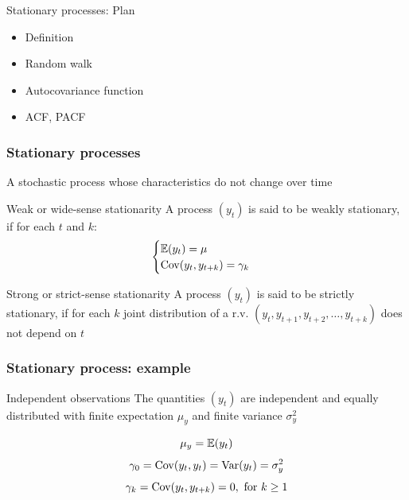 
\begin{frame} %


\end{frame}



\begin{frame}{Stationary processes: Plan}
  \begin{itemize}[<+->]
    \item Definition
    \item Random walk 
    \item Autocovariance function
    \item ACF, PACF
    
  \end{itemize}

\end{frame}

\begin{frame}
  \frametitle{Stationary processes}

   A stochastic process whose characteristics \alert{do not change over time}
  \pause

  \begin{block}{Weak or wide-sense stationarity}
    A process $(y_t)$  is said to be   \alert{weakly stationary}, if for each $t$ and $k$:
    \[
    \begin{cases}
      \mathbb{E}(y_t ) = \mu \\
      \operatorname{Cov}(y_t, y_{t+k}) = \gamma_k \\          
    \end{cases}
    \]
  \end{block}

  \pause
  \begin{block}{Strong or strict-sense stationarity}
    A process $(y_t)$  is said to be   \alert{ strictly stationary}, if for each  $k$ 
    joint  distribution of a r.v.  $(y_t, y_{t+1}, y_{t+2}, \ldots, y_{t+k})$ does not depend on  $t$
  \end{block}
\end{frame}




\begin{frame}
	\frametitle{Stationary process: example}
	
	\begin{block}{Independent observations}
		The quantities $(y_t)$ are independent and equally distributed
		with finite expectation $\mu_y$ and finite variance $\sigma^2_y$
	\end{block}
	
	\pause
	\[
	\mu_y = \mathbb{E}(y_t)
	\]
	\pause
	\[
	\gamma_0 = \operatorname{Cov}(y_t, y_t) = \operatorname{Var}(y_t) = \sigma^2_y
	\]
	\pause
	\[
	\gamma_k = \operatorname{Cov}(y_t, y_{t+k}) = 0, \text{ for } k \geq 1
	\]
\end{frame}



